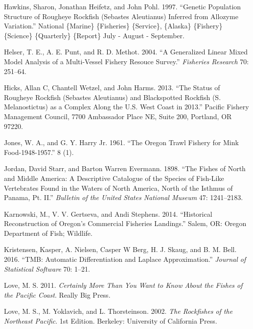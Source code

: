 \documentclass[
]{scrartcl}
\newlength{\cslhangindent}
\newenvironment{CSLReferences}[2] %
 {\begin{list}{}{%
  \setlength{\itemindent}{0pt}
  \setlength{\leftmargin}{0pt}
  \setlength{\parsep}{0pt}
  \ifodd #1
   \setlength{\leftmargin}{\cslhangindent}
   \setlength{\itemindent}{-1\cslhangindent}
  \fi
  \setlength{\itemsep}{#2\baselineskip}}}
 {\end{list}}
\begin{document}
\begin{CSLReferences}{1}{0}
Hawkins, Sharon, Jonathan Heifetz, and John Pohl. 1997. {``Genetic
Population Structure of Rougheye Rockfish ({Sebastes} Aleutianus)
Inferred from Allozyme Variation.''} National \{Marine\} \{Fisheries\}
\{Service\}, \{Alaska\} \{Fishery\} \{Science\} \{Quarterly\} \{Report\}
July - August - September.

Helser, T. E., A. E. Punt, and R. D. Methot. 2004. {``A Generalized
Linear Mixed Model Analysis of a Multi-Vessel Fishery Resouce Survey.''}
\emph{Fisheries Research} 70: 251--64.

Hicks, Allan C, Chantell Wetzel, and John Harms. 2013. {``The Status of
Rougheye Rockfish ({Sebastes} Aleutianus) and Blackspotted Rockfish
({S}. Melanostictus) as a Complex Along the {U}.{S}. {West} {Coast} in
2013.''} Pacific Fishery Management Council, 7700 Ambassador Place NE,
Suite 200, Portland, OR 97220.

Jones, W. A., and G. Y. Harry Jr. 1961. {``The {Oregon} {Trawl}
{Fishery} for {Mink} {Food}-1948-1957.''} 8 (1).

Jordan, David Starr, and Barton Warren Evermann. 1898. {``The Fishes of
{North} and {Middle} {America}: {A} Descriptive Catalogue of the Species
of Fish-Like Vertebrates Found in the Waters of {North} {America}, North
of the {Isthmus} of {Panama}, Pt. {II}.''} \emph{Bulletin of the United
States National Museum} 47: 1241--2183.

Karnowski, M., V. V. Gertseva, and Andi Stephens. 2014. {``Historical
{Reconstruction} of {Oregon}'s {Commercial} {Fisheries} {Landings}.''}
Salem, OR: Oregon Department of Fish; Wildlife.

Kristensen, Kasper, A. Nielsen, Casper W Berg, H. J. Skaug, and B. M.
Bell. 2016. {``{TMB}: {Automatic} {Differentiation} and {Laplace}
{Approximation}.''} \emph{Journal of Statistical Software} 70: 1--21.

Love, M. S. 2011. \emph{Certainly {More} {Than} {You} {Want} to {Know}
{About} the {Fishes} of the {Pacific} {Coast}}. Really Big Press.

Love, M. S., M. Yoklavich, and L. Thorsteinson. 2002. \emph{The
{Rockfishes} of the {Northeast} {Pacific}}. 1st Edition. Berkeley:
University of California Press.


\end{CSLReferences}
\end{document}
